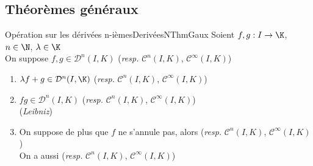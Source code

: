 \documentclass[12pt,a4paper]{report}
\begin{document}
\subsection{Théorèmes généraux}

\begin{theoreme}{Opération sur les dérivées n-ièmes}{DerivéesNThmGaux}
Soient $f,g:I\to \K$, $n\in \N$, $\lambda\in \K$\\
On suppose $f,g\in \mathcal{D}^n(I,K)$ (\textit{resp.} $\mathcal{C}^n(I,K)$, $\mathcal{C}^\infty(I,K)$)
\begin{enumerate}
    \item $\lambda f +g \in \mathcal{D}^n(I,\K)$ (\textit{resp.} $\mathcal{C}^n(I,K)$, $\mathcal{C}^\infty(I,K)$)\\
    \item $fg\in \mathcal{D}^n(I,K)$ (\textit{resp.} $\mathcal{C}^n(I,K)$, $\mathcal{C}^\infty(I,K)$)\\
     (\textit{Leibniz})
    \item On suppose de plus que $f$ ne s'annule pas, alors  (\textit{resp.} $\mathcal{C}^n(I,K)$, $\mathcal{C}^\infty(I,K)$)\\
    On a aussi  (\textit{resp.} $\mathcal{C}^n(I,K)$, $\mathcal{C}^\infty(I,K)$)
\end{enumerate}
\end{theoreme}
\end{document}
